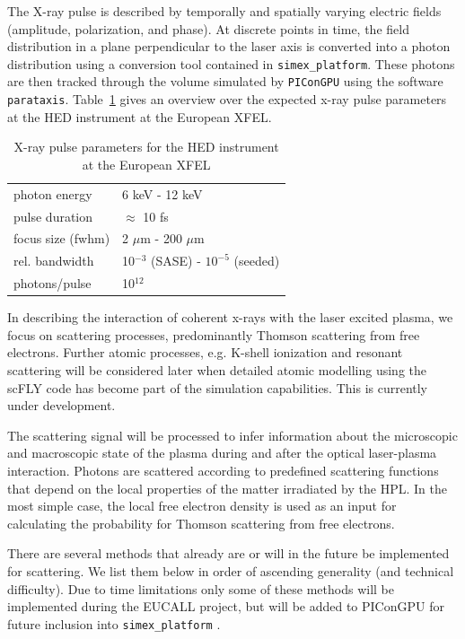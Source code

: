 \documentclass[12pt]{scrartcl}
\begin{document}
The X-ray pulse is described by temporally and spatially varying electric fields
(amplitude, polarization, and phase). At discrete points in time, the field
distribution in a plane perpendicular to the laser axis is converted into a
photon distribution using a conversion tool contained in
\texttt{simex\_platform}. These photons are then tracked through the volume simulated by
\texttt{PIConGPU} using the software \texttt{parataxis}.
Table~\ref{tab:xfel_sase2} gives an overview over the expected x-ray pulse
parameters at the HED instrument at the European XFEL.

\begin{table}[h]
  \centering
  \begin{tabular}{|l|l|}
    \hline
    photon energy &  6 keV - 12 keV \\
    pulse duration & $\approx$ 10 fs \\
    focus size (fwhm) & 2 $\mu\text{m}$ - 200 $\mu\text{m}$\\
    rel. bandwidth & 10$^{-3}$ (SASE) - $10^{-5}$ (seeded)\\
    photons/pulse & 10$^{12}$\\
    \hline
  \end{tabular}
  \caption{X-ray pulse parameters for the HED instrument at the European XFEL}
  \label{tab:xfel_sase2}
\end{table}

In describing the interaction of coherent x-rays with the laser excited plasma,
we focus on scattering processes, predominantly Thomson scattering from free
electrons. Further atomic processes, e.g. K-shell ionization and resonant
scattering will be considered later when detailed atomic modelling using the
scFLY code \cite{Chung2007} has become part of the simulation capabilities. This is
currently under development.

The scattering signal will be processed to
infer information about the microscopic and macroscopic state of the plasma
during and after the optical laser-plasma interaction.  Photons are scattered
according to predefined scattering functions that depend on the local properties
of the matter irradiated by the HPL. In the most simple case, the local free
electron density is used as an input for calculating the probability for Thomson
scattering from free electrons.

There are several methods that already are or will in the future be implemented for
scattering. We list them below in order of ascending generality (and technical
difficulty). Due to time limitations only some of these methods will be implemented
during the EUCALL project, but will be added to PIConGPU for future inclusion into
\texttt{simex\_platform} .
\end{document}
